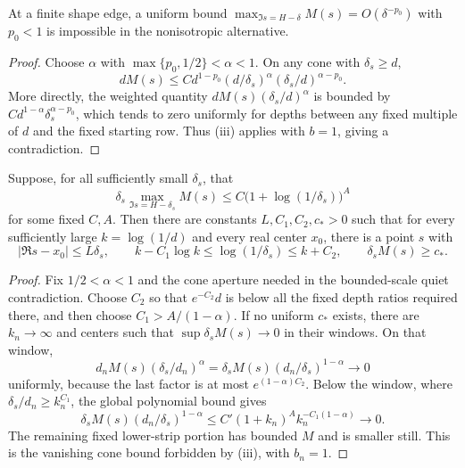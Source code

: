 \begin{proposition}\label{prop:subcritical-exclusion}
At a finite shape edge, a uniform bound
\(\max_{\Im s=H-\delta}M(s)=O(\delta^{-p_0})\) with \(p_0<1\) is
impossible in the nonisotropic alternative.
\end{proposition}

\begin{proof}
Choose \(\alpha\) with \(\max\{p_0,1/2\}<\alpha<1\). On any cone
with \(\delta_s\ge d\),
\[
 dM(s)\le C d^{1-p_0}(d/\delta_s)^\alpha
                 (\delta_s/d)^{\alpha-p_0}.
\]
More directly, the weighted quantity
\(dM(s)(\delta_s/d)^\alpha\) is bounded by
\(C d^{1-\alpha}\delta_s^{\alpha-p_0}\), which tends to zero
uniformly for depths between any fixed multiple of \(d\) and the
fixed starting row. Thus \textup{(iii)} applies
with \(b=1\), giving a contradiction.
\end{proof}

\begin{proposition}\label{cone:no-quiet-witness}
Suppose, for all sufficiently small \(\delta_s\), that
\[
 \delta_s\max_{\Im s=H-\delta_s}M(s)
 \le C\bigl(1+\log(1/\delta_s)\bigr)^A
\]
for some fixed \(C,A\). Then there are constants
\(L,C_1,C_2,c_*>0\) such that for every sufficiently large
\(k=\log(1/d)\) and every real center \(x_0\), there is a point \(s\)
with
\begin{equation}\label{cone:witness-window}
 |\Re s-x_0|\le L\delta_s,\qquad
 k-C_1\log k\le\log(1/\delta_s)\le k+C_2,
 \qquad \delta_sM(s)\ge c_*.
\end{equation}
\end{proposition}

\begin{proof}
Fix \(1/2<\alpha<1\) and the cone aperture needed in the bounded-scale
quiet contradiction. Choose \(C_2\) so that \(e^{-C_2}d\) is below
all the fixed depth ratios required there, and then choose
\(C_1>A/(1-\alpha)\). If no uniform \(c_*\) exists, there are
\(k_n\to\infty\) and centers such that
\(\sup\delta_sM(s)\to0\) in their windows. On that window,
\[
 d_nM(s)(\delta_s/d_n)^\alpha
 =\delta_sM(s)(d_n/\delta_s)^{1-\alpha}\longrightarrow0
\]
uniformly, because the last factor is at most
\(e^{(1-\alpha)C_2}\). Below the window, where
\(\delta_s/d_n\ge k_n^{C_1}\), the global polynomial bound gives
\[
 \delta_sM(s)(d_n/\delta_s)^{1-\alpha}
 \le C'(1+k_n)^A k_n^{-C_1(1-\alpha)}\longrightarrow0.
\]
The remaining fixed lower-strip portion has bounded \(M\) and is
smaller still. This is the vanishing cone bound forbidden by
\textup{(iii)}, with \(b_n=1\).
\end{proof}

